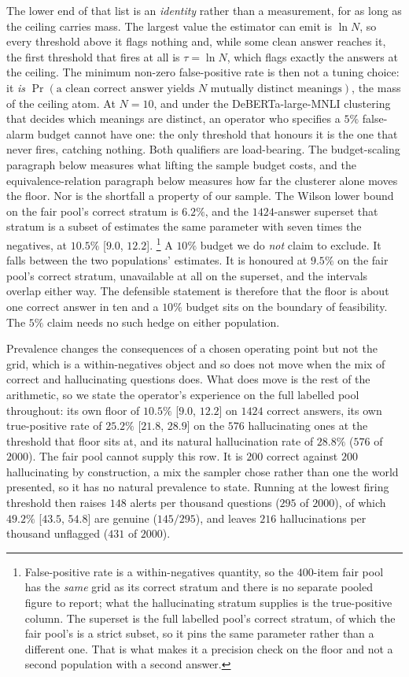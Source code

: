 The lower end of that list is an \emph{identity} rather than a measurement, for as long as the
ceiling carries mass. The largest value
the estimator can emit is $\ln N$, so every threshold above it flags nothing and, while some
clean answer reaches it, the first
threshold that fires at all is $\tau{=}\ln N$, which flags exactly the answers at the
ceiling. The minimum non-zero false-positive rate is then not a tuning choice: it
\emph{is} $\Pr(\text{a clean correct answer yields } N \text{ mutually distinct meanings})$,
the mass of the ceiling atom. At $N{=}10$, and under the DeBERTa-large-MNLI clustering that
decides which meanings are distinct, an operator who specifies a $5\%$ false-alarm
budget cannot have one: the only threshold that honours it is the one that never fires,
catching nothing. Both qualifiers are load-bearing. The budget-scaling paragraph below
measures what lifting the sample budget costs, and the equivalence-relation paragraph below
measures how far the clusterer alone moves the floor.
Nor is the shortfall a property of our sample. The Wilson lower bound on the fair pool's
correct stratum is $6.2\%$, and the $1424$-answer superset that stratum is a subset of
estimates the same parameter with seven times the negatives, at $10.5\%$ [$9.0$, $12.2$].%
\footnote{False-positive rate is a within-negatives quantity, so the $400$-item fair pool has
the \emph{same} grid as its correct stratum and there is no separate pooled figure to report;
what the hallucinating stratum supplies is the true-positive column. The superset is the full
labelled pool's correct stratum, of which the fair pool's is a strict subset, so it pins the
same parameter rather than a different one. That is what makes it a precision check on the
floor and not a second population with a second answer.}
A $10\%$ budget we do \emph{not} claim to exclude. It falls between the two populations'
estimates. It is honoured at $9.5\%$ on the fair pool's correct stratum, unavailable at all
on the superset, and the intervals overlap either way. The defensible statement is therefore
that the floor is about one correct answer in ten and a $10\%$ budget sits on the boundary of
feasibility. The $5\%$ claim needs no such hedge on either population.

Prevalence changes the consequences of a chosen operating point but not the grid, which is a
within-negatives object and so does not move when the mix of correct and hallucinating
questions does. What does move is the rest of the arithmetic, so we state the operator's
experience on the full labelled pool throughout: its own floor of $10.5\%$ [$9.0$, $12.2$] on
$1424$ correct answers, its own true-positive rate of $25.2\%$ [$21.8$, $28.9$] on the $576$
hallucinating ones at the threshold that floor sits at, and its natural hallucination rate of $28.8\%$
($576$ of $2000$). The fair pool cannot supply this row. It is $200$ correct against $200$
hallucinating by construction, a mix the sampler chose rather than one the world presented,
so it has no natural prevalence to state. Running at the lowest firing threshold then raises
$148$ alerts per thousand questions ($295$ of $2000$), of which $49.2\%$ [$43.5$, $54.8$] are
genuine ($145/295$), and leaves $216$ hallucinations per thousand unflagged ($431$ of
$2000$).


